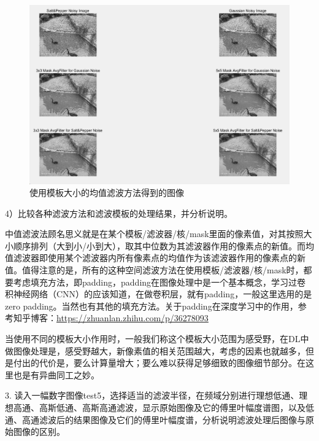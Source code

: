 \documentclass[UTF8]{article} %
\begin{document}
	\begin{figure}[H]
		\centering
		\includegraphics[width=0.85\linewidth]{screenshot010}
		\caption{使用模板大小的均值滤波方法得到的图像}
		\label{fig:3-3}
	\end{figure}
		
	
	4）比较各种滤波方法和滤波模板的处理结果，并分析说明。
	
	中值滤波法顾名思义就是在某个模板/滤波器/核/mask里面的像素值，对其按照大小顺序排列（大到小/小到大），取其中位数为其滤波器作用的像素点的新值。而均值滤波器即使用某个滤波器内所有像素点的均值作为该滤波器作用的像素点的新值。值得注意的是，所有的这种空间滤波方法在使用模板/滤波器/核/mask时，都要考虑填充方法，即padding，padding在图像处理中是一个基本概念，学习过卷积神经网络（CNN）的应该知道，在做卷积层，就有padding，一般这里选用的是zero padding。当然也有其他的填充方法。关于padding在深度学习中的作用，参考知乎博客：\url{https://zhuanlan.zhihu.com/p/36278093}
	
	当使用不同的模板大小作用时，一般我们称这个模板大小范围为感受野，在DL中做图像处理是，感受野越大，新像素值的相关范围越大，考虑的因素也就越多，但是付出的代价是，要么计算量增大；要么难以获得足够细致的图像细节部分。在这里也是有异曲同工之妙。
	
	3. 读入一幅数字图像test5，选择适当的滤波半径，在频域分别进行理想低通、理想高通、高斯低通、高斯高通滤波，显示原始图像及它的傅里叶幅度谱图，以及低通、高通滤波后的结果图像及它们的傅里叶幅度谱，分析说明滤波处理后图像与原始图像的区别。
	
\end{document}
